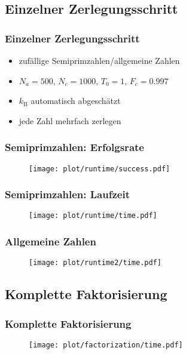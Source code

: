 \subsection*{Einzelner Zerlegungsschritt}
\begin{frame}
  \frametitle{Einzelner Zerlegungsschritt}
  \begin{itemize}
    \setlength{\itemsep}{0.3cm}

    \item zufällige Semiprimzahlen/allgemeine Zahlen
    \pause{}
    \item $N_a=500$, $N_c=1000$, $T_0=1$, $F_c=0.997$
    \item $k_\mathrm{B}$ automatisch abgeschätzt
    \pause{}
    \item jede Zahl mehrfach zerlegen
  \end{itemize}
\end{frame}
\begin{frame}
  \frametitle{Semiprimzahlen: Erfolgsrate}
  \begin{figure}[H]
    \centering
    \texttt{[image: plot/runtime/success.pdf]}
  \end{figure}
\end{frame}
\begin{frame}
  \frametitle{Semiprimzahlen: Laufzeit}
  \begin{figure}[H]
    \centering
    \texttt{[image: plot/runtime/time.pdf]}
  \end{figure}
\end{frame}
\begin{frame}
  \frametitle{Allgemeine Zahlen}
  \begin{figure}[H]
    \centering
    \texttt{[image: plot/runtime2/time.pdf]}
  \end{figure}
\end{frame}

\subsection*{Komplette Faktorisierung}
\begin{frame}
  \frametitle{Komplette Faktorisierung}
  \begin{figure}[H]
    \centering
    \texttt{[image: plot/factorization/time.pdf]}
  \end{figure}
\end{frame}

